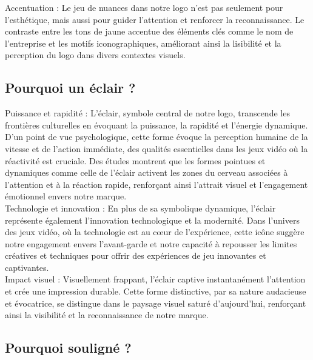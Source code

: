Accentuation : Le jeu de nuances dans notre logo n'est pas seulement pour l'esthétique, mais aussi pour guider l'attention et renforcer la reconnaissance. Le contraste entre les tons de jaune accentue des éléments clés comme le nom de l'entreprise et les motifs iconographiques, améliorant ainsi la lisibilité et la perception du logo dans divers contextes visuels.
\\

\subsection*{Pourquoi un éclair ?}

Puissance et rapidité : L'éclair, symbole central de notre logo, transcende les frontières culturelles en évoquant la puissance, la rapidité et l'énergie dynamique.
D'un point de vue psychologique, cette forme évoque la perception humaine de la vitesse et de l'action immédiate, des qualités essentielles dans les jeux vidéo où la réactivité est cruciale.
Des études montrent que les formes pointues et dynamiques comme celle de l'éclair activent les zones du cerveau associées à l'attention et à la réaction rapide, renforçant ainsi l'attrait visuel et l'engagement émotionnel envers notre marque.
\\

Technologie et innovation : En plus de sa symbolique dynamique, l'éclair représente également l'innovation technologique et la modernité.
Dans l'univers des jeux vidéo, où la technologie est au cœur de l'expérience, cette icône suggère notre engagement envers l'avant-garde et notre capacité à repousser les limites créatives et techniques pour offrir des expériences de jeu innovantes et captivantes.
\\

Impact visuel : Visuellement frappant, l'éclair captive instantanément l'attention et crée une impression durable.
Cette forme distinctive, par sa nature audacieuse et évocatrice, se distingue dans le paysage visuel saturé d'aujourd'hui, renforçant ainsi la visibilité et la reconnaissance de notre marque.
\\

\subsection*{Pourquoi souligné ?}

